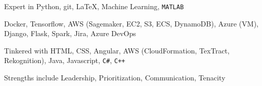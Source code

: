 

\begin{cvskills}

  \cvskill
    {Expert in} %
    {Python, git, \LaTeX, Machine Learning, {\texttt{MATLAB}}} %

    {Docker, Tensorflow, AWS (Sagemaker, EC2, S3, ECS, DynamoDB), Azure (VM), Django,
      Flask, Spark, Jira, Azure DevOps} %

  \cvskill
    {Tinkered with} %
    {HTML, CSS, Angular, AWS (CloudFormation, TexTract, Rekognition), Java, Javascript,
      {\texttt{C\#}}, {\texttt{C++}}} %

  \cvskill
    {Strengths include} %
    {Leadership, Prioritization, Communication, Tenacity} %

\end{cvskills}
